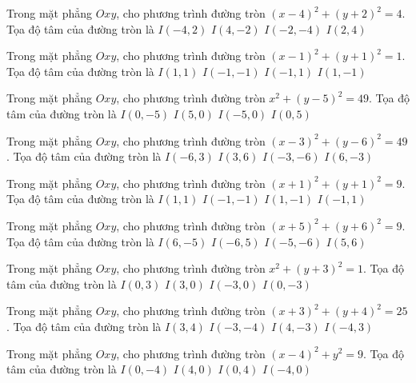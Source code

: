 \begin{ex}
Trong mặt phẳng $Oxy$, cho phương trình đường tròn $(x -4)^2   + (y + 2)^2 = 4$. Tọa độ tâm của đường tròn là
\choice
{ $I(-4, 2)$ }
{ \True $I(4, -2)$ }
{ $I(-2, -4)$ }
{ $I(2, 4)$ }
\end{ex}

\begin{ex}
Trong mặt phẳng $Oxy$, cho phương trình đường tròn $(x -1)^2   + (y + 1)^2 = 1$. Tọa độ tâm của đường tròn là
\choice
{ $I(1, 1)$ }
{ $I(-1, -1)$ }
{ $I(-1, 1)$ }
{ \True $I(1, -1)$ }
\end{ex}

\begin{ex}
Trong mặt phẳng $Oxy$, cho phương trình đường tròn $x^2 + (y -5)^2 = 49$. Tọa độ tâm của đường tròn là
\choice
{ $I(0, -5)$ }
{ $I(5, 0)$ }
{ $I(-5, 0)$ }
{ \True $I(0, 5)$ }
\end{ex}

\begin{ex}
Trong mặt phẳng $Oxy$, cho phương trình đường tròn $(x -3)^2   + (y -6)^2 = 49$. Tọa độ tâm của đường tròn là
\choice
{ $I(-6, 3)$ }
{ \True $I(3, 6)$ }
{ $I(-3, -6)$ }
{ $I(6, -3)$ }
\end{ex}

\begin{ex}
Trong mặt phẳng $Oxy$, cho phương trình đường tròn $(x + 1)^2  + (y + 1)^2 = 9$. Tọa độ tâm của đường tròn là
\choice
{ $I(1, 1)$ }
{ \True $I(-1, -1)$ }
{ $I(1, -1)$ }
{ $I(-1, 1)$ }
\end{ex}

\begin{ex}
Trong mặt phẳng $Oxy$, cho phương trình đường tròn $(x + 5)^2  + (y + 6)^2 = 9$. Tọa độ tâm của đường tròn là
\choice
{ $I(6, -5)$ }
{ $I(-6, 5)$ }
{ \True $I(-5, -6)$ }
{ $I(5, 6)$ }
\end{ex}

\begin{ex}
Trong mặt phẳng $Oxy$, cho phương trình đường tròn $x^2 + (y + 3)^2 = 1$. Tọa độ tâm của đường tròn là
\choice
{ $I(0, 3)$ }
{ $I(3, 0)$ }
{ $I(-3, 0)$ }
{ \True $I(0, -3)$ }
\end{ex}

\begin{ex}
Trong mặt phẳng $Oxy$, cho phương trình đường tròn $(x + 3)^2  + (y + 4)^2 = 25$. Tọa độ tâm của đường tròn là
\choice
{ $I(3, 4)$ }
{ \True $I(-3, -4)$ }
{ $I(4, -3)$ }
{ $I(-4, 3)$ }
\end{ex}

\begin{ex}
Trong mặt phẳng $Oxy$, cho phương trình đường tròn $(x -4)^2   + y^2 = 9$. Tọa độ tâm của đường tròn là
\choice
{ $I(0, -4)$ }
{ \True $I(4, 0)$ }
{ $I(0, 4)$ }
{ $I(-4, 0)$ }
\end{ex}

